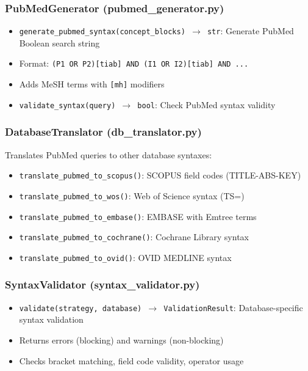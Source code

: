 \documentclass[11pt,a4paper]{article}
\begin{document}
\subsubsection{PubMedGenerator (pubmed\_generator.py)}
\begin{itemize}[nosep]
  \item \texttt{generate\_pubmed\_syntax(concept\_blocks) $\to$ str}: Generate PubMed Boolean search string
  \item Format: \texttt{(P1 OR P2)[tiab] AND (I1 OR I2)[tiab] AND ...}
  \item Adds MeSH terms with \texttt{[mh]} modifiers
  \item \texttt{validate\_syntax(query) $\to$ bool}: Check PubMed syntax validity
\end{itemize}

\subsubsection{DatabaseTranslator (db\_translator.py)}
Translates PubMed queries to other database syntaxes:
\begin{itemize}[nosep]
  \item \texttt{translate\_pubmed\_to\_scopus()}: SCOPUS field codes (TITLE-ABS-KEY)
  \item \texttt{translate\_pubmed\_to\_wos()}: Web of Science syntax (TS=)
  \item \texttt{translate\_pubmed\_to\_embase()}: EMBASE with Emtree terms
  \item \texttt{translate\_pubmed\_to\_cochrane()}: Cochrane Library syntax
  \item \texttt{translate\_pubmed\_to\_ovid()}: OVID MEDLINE syntax
\end{itemize}

\subsubsection{SyntaxValidator (syntax\_validator.py)}
\begin{itemize}[nosep]
  \item \texttt{validate(strategy, database) $\to$ ValidationResult}: Database-specific syntax validation
  \item Returns errors (blocking) and warnings (non-blocking)
  \item Checks bracket matching, field code validity, operator usage
\end{itemize}

\end{document}
